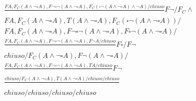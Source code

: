\documentclass[a4paper,12pt, oneside]{book}
\begin{document}
\begin{esempio}
{{\begin{gather*}
        \frac{FA, F_C(A\land\neg\square A), F\neg\square\neg(A\land \neg\square
        A), 
        F_C(\square\neg(A\land\neg\square A)\land\neg A)/chiuso}{}
        F\neg/F_C\land\\ 
        FA, F_C(A\land \neg\square A), T(A\land \neg\square A),
        F_C(\square\neg(A\land\neg\square A))/\\
        FA,  F_C(A\land \neg\square A), F\neg\square\neg(A\land\neg\square A),
        F\square\neg(A\land\neg\square A)/\\
        \frac{FA, F_C(A\land\neg\square A), F\neg\square\neg(A\land\neg\square
        A),F\neg A/chiuso}{}F\square/F\neg\\
        chiuso/F_C(A\land\neg\square A), F\neg(A\land\neg\square A)/\\
        \frac{FA,F_C(A\land\neg\square A),F\neg\square\neg(A\land\neg\square A),
        TA/chiuso }{}F\neg\\
        \frac{chiuso/F_C(A\land\neg\square A), T(A\land\neg\square
        A)/chiuso/chiuso}{} \\
        chiuso/chiuso/chiuso/chiuso
      \end{gather*}
    }}
\end{esempio}
\end{document}

